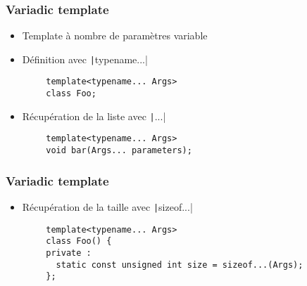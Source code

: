 \documentclass[C++.tex]{subfiles}
\begin{document}
\begin{frame}[fragile]
	\frametitle{Variadic template}
	\begin{itemize}
		\item Template à nombre de paramètres variable
		\item Définition avec \texttt|typename...|
	\end{itemize}

	\begin{verbatim}
		template<typename... Args>
		class Foo;
	\end{verbatim}

	\begin{itemize}
		\item Récupération de la liste avec \texttt|...|
	\end{itemize}

	\begin{verbatim}
		template<typename... Args>
		void bar(Args... parameters);
	\end{verbatim}
\end{frame}

\begin{frame}[fragile]
	\frametitle{Variadic template}
	\begin{itemize}
		\item Récupération de la taille avec \texttt|sizeof...|
	\end{itemize}

	\begin{verbatim}
		template<typename... Args>
		class Foo() {
		private :
		  static const unsigned int size = sizeof...(Args);
		};
	\end{verbatim}
\end{frame}
\end{document}
